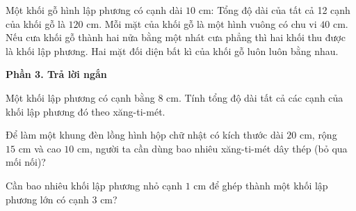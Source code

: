 \begin{ex} %
Một khối gỗ hình lập phương có cạnh dài $10\text{ cm}$:
\choiceTF
{\True Tổng độ dài của tất cả 12 cạnh của khối gỗ là $120\text{ cm}$.}
{\True Mỗi mặt của khối gỗ là một hình vuông có chu vi $40\text{ cm}$.}
{Nếu cưa khối gỗ thành hai nửa bằng một nhát cưa phẳng thì hai khối thu được là khối lập phương.}
{\True Hai mặt đối diện bất kì của khối gỗ luôn luôn bằng nhau.}
\end{ex}

\textbf{Phần 3. Trả lời ngắn}

\begin{ex} %
Một khối lập phương có cạnh bằng $8\text{ cm}$. Tính tổng độ dài tất cả các cạnh của khối lập phương đó theo xăng-ti-mét.
\end{ex}

\begin{ex} %
Để làm một khung đèn lồng hình hộp chữ nhật có kích thước dài $20\text{ cm}$, rộng $15\text{ cm}$ và cao $10\text{ cm}$, người ta cần dùng bao nhiêu xăng-ti-mét dây thép (bỏ qua mối nối)?
\end{ex}

\begin{ex} %
Cần bao nhiêu khối lập phương nhỏ cạnh $1\text{ cm}$ để ghép thành một khối lập phương lớn có cạnh $3\text{ cm}$?
\end{ex}


